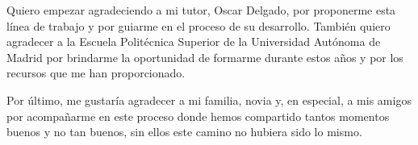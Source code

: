 Quiero empezar agradeciendo a mi tutor, Oscar Delgado, por proponerme esta línea de trabajo y por guiarme en el proceso de su desarrollo. También quiero agradecer a la Escuela Politécnica Superior de la Universidad Autónoma de Madrid por brindarme la oportunidad de formarme durante estos años y por los recursos que me han proporcionado. 

Por último, me gustaría agradecer a mi familia, novia y, en especial, a mis amigos por acompañarme en este proceso donde hemos compartido tantos momentos buenos y no tan buenos, sin ellos este camino no hubiera sido lo mismo.